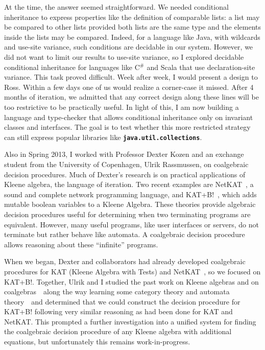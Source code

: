 \documentclass[12pt]{article}
\newcommand{\mono}[1]{\textbf{\texttt{#1}}}
\newcommand{\hdr}[2]{\vspace{-0.4cm}{\flushleft{\hrulefill\\\textbf{#1}\hfill{#2}\\\vspace{-0.2cm}\hrulefill}}\vspace{0.1cm}}
\begin{document}
At the time, the answer seemed straightforward.
We needed conditional inheritance to express properties like the definition of comparable lists: a list may be compared to other lists provided both lists are the same type and the elements inside the lists may be compared.
Indeed, for a language like Java, with wildcards and use-site variance, such conditions are decidable in our system.
However, we did not want to limit our results to use-site variance, so I explored decidable conditional inheritance for languages like C$^{\#}$ and Scala that use declaration-site variance.
This task proved difficult.
Week after week, I would present a design to Ross.
Within a few days one of us would realize a corner-case it missed.
After 4 months of iteration, we admitted that any correct design along these lines will be too restrictive to be practically useful.
In light of this, I am now building a language and type-checker that allows conditional inheritance only on invariant classes and interfaces.
The goal is to test whether this more restricted strategy can still express popular libraries like \mono{java.util.collections}.


\hdr{Kleene Coalgebras}{Spring 2014}

Also in Spring 2013, I worked with Professor Dexter Kozen and an exchange student from the University of Copenhagen, Ulrik Rassmussen, on coalgebraic decision procedures.
Much of Dexter's research is on practical applications of Kleene algebra, the language of iteration.
Two recent examples are NetKAT~\cite{anderson2014netkat}, a sound and complete network programming language, and KAT+B!~\cite{GKM14a}, which adds mutable boolean variables to a Kleene Algebra.
These theories provide algebraic decision procedures useful for determining when two terminating programs are equivalent.
However, many useful programs, like user interfaces or servers, do not terminate but rather behave like automata.
A coalgebraic decision procedure allows reasoning about these ``infinite'' programs.

When we began, Dexter and collaborators had already developed coalgebraic procedures for KAT (Kleene Algebra with Tests) and NetKAT~\cite{foster2014coalgebraic}, so we focused on KAT+B!.
Together, Ulrik and I studied the past work on Kleene algebras and on coalgebras~\textemdash~along the way learning some category theory and automata theory~\textemdash~and determined that we could construct the decision procedure for KAT+B! following very similar reasoning as had been done for KAT and NetKAT.
This prompted a further investigation into a unified system for finding the coalgebraic decision procedure of any Kleene algebra with additional equations, but unfortunately this remains work-in-progress.


\vfill
\renewcommand{\section}[2]{}
\begin{multicols}{2}
\footnotesize


\end{multicols}
\end{document}
